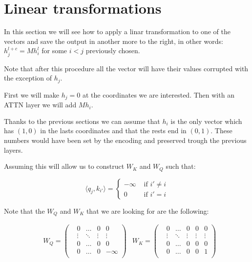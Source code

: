 \section*{Linear transformations}

In this section we will see how to apply a linar transformation to one of the vectors and save the output in another more to the right, in other words: $h_j^{l+c} = M h_i^l$ for some $i < j$ previously chosen.

Note that after this procedure all the vector will have their values corrupted with the exception of $h_j$.

\bigskip

First we will make $h_j = 0$ at the coordinates we are interested. Then with an ATTN layer we will add $M h_i$.

Thanks to the previous sections we can assume that $h_i$ is the only vector which has $(1,0)$ in the lasts coordinates and that the rests end in $(0,1)$. These numbers would have been set by the encoding and preserved trough the previous layers.

Assuming this will allow us to construct $W_K$ and $W_Q$ such that:

\[
\langle q_{j}, k_{i'} \rangle = \begin{cases}
    -\infty &\text{ if } i' \neq i \\
    0  &\text{ if } i' = i 
\end{cases}
\]

Note that the $W_Q$ and $W_K$ that we are looking for are the following:

\begin{align*}
    & W_Q = \left(\begin{matrix}
    &0      &\hdots &0      &0          \\
    &\vdots &\ddots &\vdots &\vdots     \\
    &0      &\hdots &0      &0          \\
    &0      &\hdots &0      &-\infty    \\
\end{matrix}\right)
    &W_K = \left(\begin{matrix}
    &0      &\hdots &0      &0      &0      \\
    &\vdots &\ddots &\vdots &\vdots &\vdots \\
    &0      &\hdots &0      &0      &0      \\
    &0      &\hdots &0      &0      &1      \\
\end{matrix}\right)
\end{align*}


